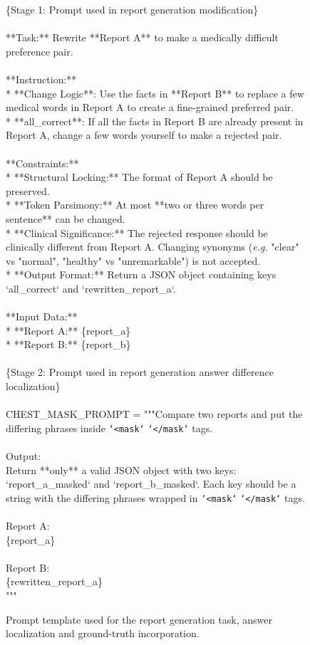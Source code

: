 \begin{figure}[ht]
\centering
\begin{tcolorbox}[colback=boxgray, colframe=black!70, boxrule=0.5pt, arc=0mm, left=8pt, right=8pt, top=8pt, bottom=8pt]
\small \ttfamily
\{Stage 1: Prompt used in report generation modification\} \\ \\
**Task:** Rewrite **Report A** to make a medically difficult preference pair. \\
\\
**Instruction:** \\
* **Change Logic**: Use the facts in **Report B** to replace a few medical words in Report A to create a fine-grained preferred pair. \\
* **all\_correct**: If all the facts in Report B are already present in Report A, change a few words yourself to make a rejected pair. \\
\\
**Constraints:** \\
* **Structural Locking:** The format of Report A should be preserved. \\
* **Token Parsimony:** At most **two or three words per sentence** can be changed. \\
* **Clinical Significance:** The rejected response should be clinically different from Report A. Changing synonyms (\textit{e.g.} "clear" vs "normal", "healthy" vs "unremarkable") is not accepted. \\
* **Output Format:** Return a JSON object containing keys `all\_correct` and `rewritten\_report\_a`. \\
\\
**Input Data:** \\
* **Report A:** \{report\_a\} \\
* **Report B:** \{report\_b\} \\
\\
\{Stage 2: Prompt used in report generation answer difference localization\} \\ \\
CHEST\_MASK\_PROMPT = """Compare two reports and put the differing phrases inside \texttt{`<mask\>`} \texttt{`</mask\>`} tags. \\
\\
Output: \\
Return **only** a valid JSON object with two keys: `report\_a\_masked` and `report\_b\_masked`. Each key should be a string with the differing phrases wrapped in \texttt{`<mask\>`} \texttt{`</mask\>`} tags. \\
\\
Report A: \\
\{report\_a\} \\
\\
Report B: \\
\{rewritten\_report\_a\} \\
"""
\end{tcolorbox}
\caption{Prompt template used for the report generation task, answer localization and ground-truth incorporation.}
\label{fig:prompt_stage2}
\end{figure}

